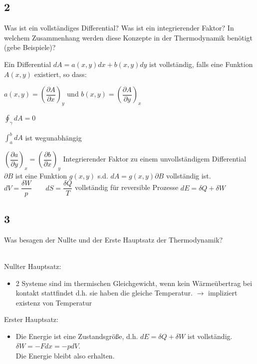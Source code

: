\documentclass[12pt,a4paper]{report}
\newenvironment{myfrag}{\begin{it}}{\end{it}\vspace{3mm}\par}
\numberwithin{equation}{section}
\begin{document}
\subsection{2}
\begin{myfrag}
Was ist ein vollständiges Differential? Was ist ein integrierender Faktor?
In welchem Zusammenhang werden diese Konzepte in der
Thermodynamik benötigt (gebe Beispiele)?
\end{myfrag} \qquad \newline
Ein Differential $dA = a(x,y)dx+b(x,y)dy$ ist vollständig, falls eine Funktion $A(x,y)$ existiert, so dass:
\begin{compactenum}[(i)]
\item $a(x,y) = \left(\dfrac{\partial A}{\partial x} \right) _y $ und $b(x,y) = \left( \dfrac{\partial A}{\partial y} \right) _x $
\item $\oint_\gamma dA = 0 $
\item $\int_a^b dA $ ist wegunabhängig
\item $\left(\dfrac{\partial a}{\partial y} \right) _x = \left(\dfrac{\partial b}{\partial x} \right) _y $
Integrierender Faktor zu einem unvollständigem Differential $\partial B$ ist eine Funktion $g(x,y)$ s.d. $dA = g(x,y)\partial B $ vollständig ist. \newline
$ dV = \dfrac{\delta W}{p} \qquad dS = \dfrac{\delta Q}{T}$ \quad vollständig für reversible Prozesse 
$ dE = \delta Q + \delta W$
\end{compactenum}
\subsection{3}
\begin{myfrag}
Was besagen der Nullte und der Erste Hauptsatz der Thermodynamik?
\end{myfrag} \quad \\
Nullter Hauptsatz:
\begin{itemize}
\item 2 Systeme sind im thermischen Gleichgewicht, wenn kein Wärmeübertrag bei kontakt stattfindet d.h. sie haben die gleiche Temperatur.
$\rightarrow$ impliziert existenz von Temperatur
\end{itemize}
Erster Hauptsatz:
\begin{itemize}
\item Die Energie ist eine Zustandsgröße, d.h. $dE= \delta Q + \delta W $ ist vollständig. $ \delta W = -Fdx = -pdV$.\\
Die Energie bleibt also erhalten.
\end{itemize}
\end{document}
